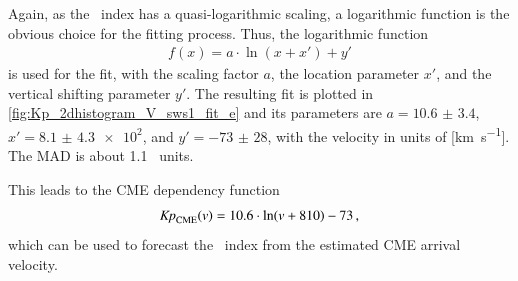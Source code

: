 Again, as the \Kp~index has a quasi-logarithmic scaling, a logarithmic function is the obvious choice for the fitting process. Thus, the logarithmic function
\begin{align}
	f(x) = a \cdot \ln\left(x + x'\right) + y'	\label{eq:log_offset_fit_function}
\end{align}
is used for the fit, with the scaling factor $a$, the location parameter $x'$, and the vertical shifting parameter $y'$. The resulting fit is plotted in \autoref{fig:Kp_2dhistogram_V_sws1_fit_e} and its parameters are $a = \num{10.6(34)}$, $x' = \num{8.1(43)e2}$, and $y' = \num{-73(28)}$, with the velocity in units of [\si{\km\per\s}]. The MAD is about 1.1~\Kp{} units.
\begin{figure}
\end{figure}
This leads to the CME dependency function
\begin{align}
	\textit{Kp}_\text{CME}(v) = 10.6 \cdot \ln(v + 810) - 73	\,,	\label{eq:kpvsv_CME_dependency_function}
\end{align}
which can be used to forecast the \Kp{}~index from the estimated CME arrival velocity.\\


